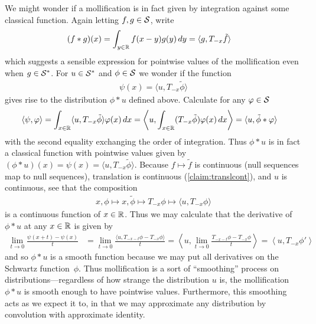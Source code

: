     We might wonder if a mollification is in fact given by integration against some classical function.
    Again letting $f,g\in\S$, write
    \begin{align*}
      (f*g)(x)
      &= \int_{y\in\R} f(x-y)g(y)\,dy
      = \langle g, T_{-x}\tilde f\rangle
    \end{align*}
    which suggests a sensible expression for pointwise values of the mollification even when $g\in\SS$.
    For $u\in\SS$ and $\phi\in\S$ we wonder if the function
    \begin{align*}
      \psi(x) = \langle u, T_{-x}\tilde\phi\rangle
    \end{align*}
    gives rise to the distribution $\phi*u$ defined above.
    Calculate for any $\varphi\in\S$
    \begin{align*}
      \left\langle \psi, \varphi \right\rangle
      &= \int_{x\in\R} \langle u,T_{-x}\tilde\phi\rangle\varphi(x)\,dx
      = \left\langle u, \int_{x\in\R} (T_{-x}\tilde\phi)\varphi(x)\,dx \right\rangle
      = \langle u, \tilde\phi*\varphi\rangle
    \end{align*}
    with the second equality exchanging the order of integration.
    Thus $\phi*u$ is in fact a classical function with pointwise values given by $(\phi*u)(x)=\psi(x)=\langle u, T_{-x}\tilde\phi\rangle$.
    Because $f\mapsto\tilde f$ is continuous (null sequences map to null sequences), translation is continuous (\cref{claim:translcont}), and $u$ is continuous, see that the composition
    \begin{align*}
      x, \phi \mapsto x, \tilde\phi \mapsto T_{-x}\phi \mapsto \langle u, T_{-x}\phi \rangle
    \end{align*}
    is a continuous function of $x\in\R$.
    Thus we may calculate that the derivative of $\phi*u$ at any $x\in\R$ is given by
    \begin{align*}
      \lim_{t\rightarrow0} \frac{\psi(x+t) - \psi(x)}{t}
      &= \lim_{t\rightarrow0} \frac{\langle u, T_{-x-t}\phi-T_{-x}\phi\rangle}{t}
      = \left\langle u, \lim_{t\rightarrow0} \frac{T_{-x-t}\phi-T_{-x}\phi}{t}\right\rangle
      = \left\langle u, T_{-x}\phi'\right\rangle
    \end{align*}
    and so $\phi*u$ is a smooth function because we may put all derivatives on the Schwartz function~$\phi$.
    Thus mollification is a sort of ``smoothing'' process on distributions---regardless of how strange the distribution $u$ is, the mollification $\phi*u$ is smooth enough to have pointwise values.
    Furthermore, this smoothing acts as we expect it to, in that we may approximate any distribution by convolution with approximate identity. 

